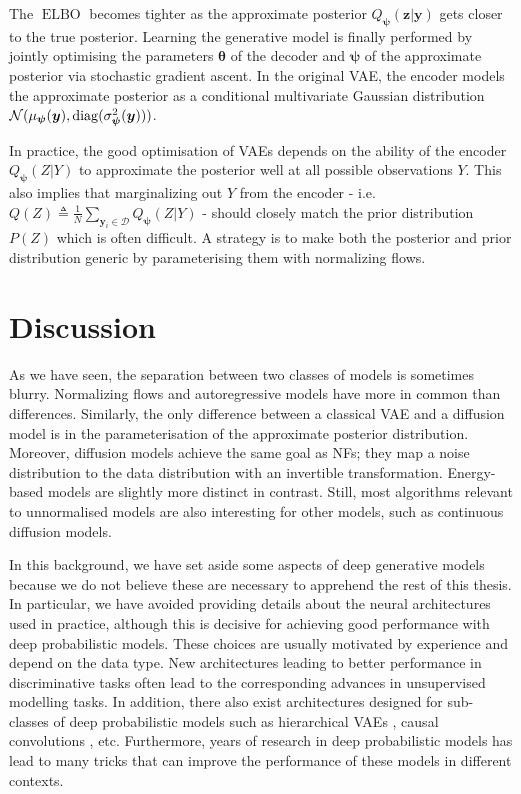 The $\operatorname{ELBO}$ becomes tighter as the approximate posterior $Q_{\bm \psi}(\mathbf{z}|\mathbf{y})$ gets closer to the true posterior.
Learning the generative model is finally performed by jointly optimising the parameters $\mathbf{\theta}$ of the decoder and ${\bm \psi}$ of the approximate posterior via stochastic gradient ascent.
In the original VAE, the encoder models the approximate posterior as a conditional multivariate Gaussian distribution $\mathcal{N}(\mu_{\bm \psi}(\mathbf{y}), \diag(\sigma_{\bm\psi}^2(\mathbf{y})))$.

In practice, the good optimisation of VAEs depends on the ability of the encoder $Q_{\bm \psi}(Z|Y)$ to approximate the posterior well at all possible observations $Y$. This also implies that marginalizing out $Y$ from the encoder - i.e. $Q(Z) \triangleq \frac{1}{N}\sum_{\bm{y}_i \in \mathcal{D}} Q_{\bm \psi}(Z|Y)$ - should closely match the prior distribution $P(Z)$ which is often difficult. A strategy is to make both the posterior and prior distribution generic by parameterising them with normalizing flows.

\section{Discussion}
As we have seen, the separation between two classes of models is sometimes blurry. Normalizing flows and autoregressive models have more in common than differences. Similarly, the only difference between a classical VAE and a diffusion model is in the parameterisation of the approximate posterior distribution. Moreover, diffusion models achieve the same goal as NFs; they map a noise distribution to the data distribution with an invertible transformation. Energy-based models are slightly more distinct in contrast. Still, most algorithms relevant to unnormalised models are also interesting for other models, such as continuous diffusion models.

In this background, we have set aside some aspects of deep generative models because we do not believe these are necessary to apprehend the rest of this thesis. In particular, we have avoided providing details about the neural architectures used in practice, although this is decisive for achieving good performance with deep probabilistic models. These choices are usually motivated by experience and depend on the data type. New architectures leading to better performance in discriminative tasks often lead to the corresponding advances in unsupervised modelling tasks. In addition, there also exist architectures designed for sub-classes of deep probabilistic models such as hierarchical VAEs \citep{vahdat_nvae_2020}, causal convolutions \citep{van_den_oord_wavenet_2016}, etc. Furthermore, years of research in deep probabilistic models has lead to many tricks that can improve the performance of these models in different contexts.

